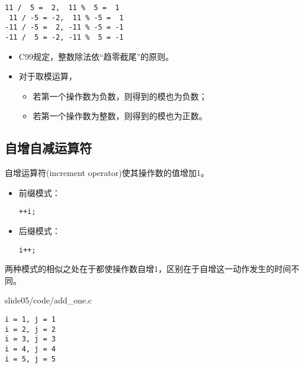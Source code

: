 \begin{frame}[fragile]
\begin{lstlisting}[backgroundcolor=\color{red!10}]
 11 /  5 =  2,  11 %  5 =  1
 11 / -5 = -2,  11 % -5 =  1
-11 / -5 =  2, -11 % -5 = -1
-11 /  5 = -2, -11 %  5 = -1
\end{lstlisting} \pause 

\begin{itemize}
\item C99规定，整数除法依“趋零截尾”的原则。\\[0.1in]
\item 对于取模运算，
  \begin{itemize}
  \item 若第一个操作数为负数，则得到的模也为负数；
  \item 若第一个操作数为整数，则得到的模也为正数。
  \end{itemize}
\end{itemize}
\end{frame}

\subsection{自增自减运算符}
\begin{frame}[fragile]
自增运算符(increment operator)使其操作数的值增加1。\vspace{0.1in}

\begin{itemize}
\item 前缀模式：
\begin{lstlisting}[backgroundcolor=\color{red!10}]
++i;
\end{lstlisting} 
\item 后缀模式：
\begin{lstlisting}[backgroundcolor=\color{red!10}]
i++;
\end{lstlisting} 
\end{itemize}
两种模式的相似之处在于都使操作数自增1，区别在于自增这一动作发生的时间不同。
\end{frame}

\begin{frame}[fragile]
  
  {slide05/code/add_one.c}

\begin{lstlisting}[backgroundcolor=\color{red!10}]
i = 1, j = 1
i = 2, j = 2
i = 3, j = 3
i = 4, j = 4
i = 5, j = 5
\end{lstlisting}    
\end{frame}


